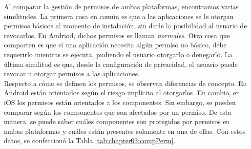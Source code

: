 Al comparar la gestión de permisos de ambas plataformas, encontramos varias similitudes. La primera cosa en común es que a las aplicaciones se le otorgan permisos básicos al momento de instalación, sin darle la posibilidad al usuario de revocarlos. En Andriod, dichos permisos se llaman \emph{normales}. Otra cosa que comparten es que si una aplicación necesita algún permiso no básico, debe requerirlo mientras se ejecuta, pudiendo el usuario otorgarlo o denegarlo. La última similitud es que, desde la configuración de privacidad, el usuario puede revocar u otorgar permisos a las aplicaciones.\\

Respecto a cómo se definen los permisos, se observan diferencias de concepto. En Android están orientados según el riesgo implícito al otorgarlos. En cambio, en iOS los permisos están orientados a los componentes. Sin embargo, se pueden comparar según los componentes que son afectados por un permiso. De esta manera, se puede saber cuáles componentes son protegidos por permisos en ambas plataformas y cuáles están presentes solamente en una de ellas. Con estos datos, se confeccionó la Tabla \ref{tab:chapter03:compPerm}.\\


